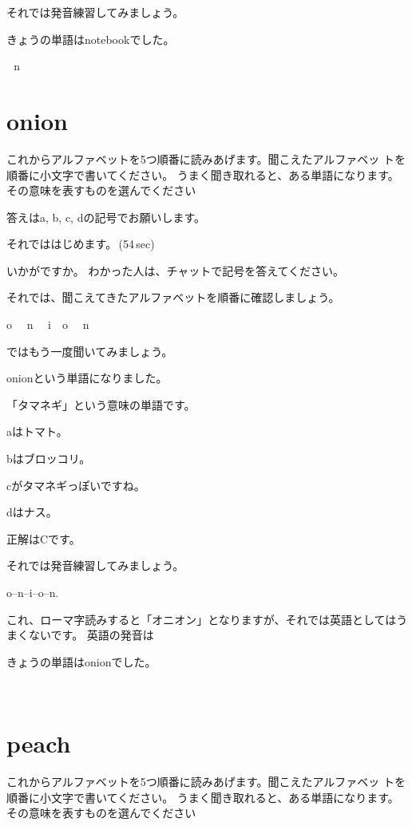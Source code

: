 \documentclass[12pt]{jlreq}
\let\textipa\undefined
\begin{document}
それでは発音練習してみましょう。

きょうの単語はnotebookでした。

{\large \ComputerMouse}\,\,
n
\newpage
\section{onion}

これからアルファベットを5つ順番に読みあげます。聞こえたアルファベッ
トを順番に小文字で書いてください。
うまく聞き取れると、ある単語になります。
その意味を表すものを選んでください

答えはa, b, c, dの記号でお願いします。

それでははじめます。\faVolumeUp\,(54\,sec)

いかがですか。
わかった人は、チャットで記号を答えてください。

それでは、聞こえてきたアルファベットを順番に確認しましょう。{\large \ComputerMouse}

o\,\,
{\large \ComputerMouse}\,\,
n\,\,
{\large \ComputerMouse}\,\,
i
{\large \ComputerMouse}\,\,
o\,\,
{\large \ComputerMouse}\,\,
n\,\,

ではもう一度聞いてみましょう。

onionという単語になりました。

「タマネギ」という意味の単語です。

aはトマト。

bはブロッコリ。

cがタマネギっぽいですね。

dはナス。


正解はCです。

それでは発音練習してみましょう。

o--n--i--o--n.

これ、ローマ字読みすると「オニオン」となりますが、それでは英語としてはうまくないです。
英語の発音は\textipa{/2nj@n/}

きょうの単語はonionでした。

{\large \ComputerMouse}\,\,
\newpage
\section{peach}

これからアルファベットを5つ順番に読みあげます。聞こえたアルファベッ
トを順番に小文字で書いてください。
うまく聞き取れると、ある単語になります。
その意味を表すものを選んでください
\end{document}
